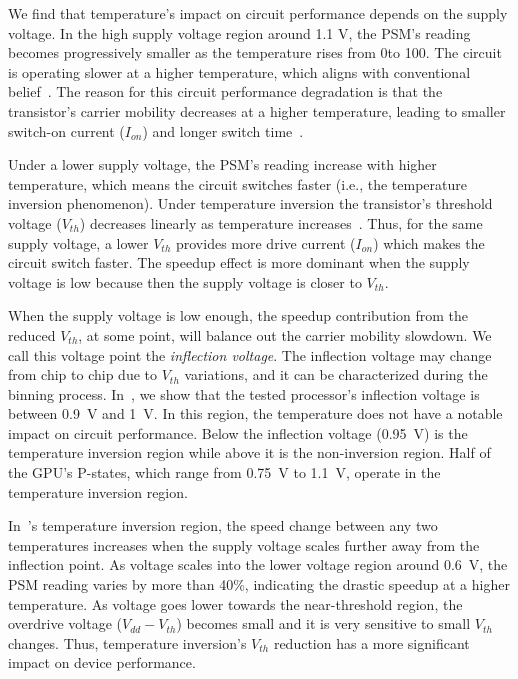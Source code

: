 We find that temperature's impact on circuit performance depends on the supply voltage. In the high supply voltage region around 1.1 V, the PSM's reading becomes progressively smaller as the temperature rises from 0\C to 100\C. The circuit is operating slower at a higher temperature, which aligns with conventional belief~\cite{leng2015safe}. The reason for this circuit performance degradation is that the transistor's carrier mobility decreases at a higher temperature, leading to smaller switch-on current ($I_{on}$) and longer switch time~\cite{wolpert2012temperature}.

Under a lower supply voltage, the PSM's reading increase with higher temperature, which means the circuit switches faster (i.e., the temperature inversion phenomenon). Under temperature inversion the transistor's threshold voltage ($V_{th}$) decreases linearly as temperature increases~\cite{wolpert2012temperature,park1995reversal,dasdan2006handling}. Thus, for the same supply voltage, a lower $V_{th}$ provides more drive current ($I_{on}$) which makes the circuit switch faster. The speedup effect is more dominant when the supply voltage is low because then the supply voltage is closer to $V_{th}$.

When the supply voltage is low enough, the speedup contribution from the reduced $V_{th}$, at some point, will balance out the carrier mobility slowdown. We call this voltage point the {\it inflection voltage}. The inflection voltage may change from chip to chip due to $V_{th}$ variations, and it can be characterized during the binning process. In~, we show that the tested processor's inflection voltage is between 0.9~V and 1~V. In this region, the temperature does not have a notable impact on circuit performance. Below the inflection voltage (0.95~V) is the temperature inversion region while above it is the non-inversion region. Half of the GPU's P-states, which range from 0.75~V to 1.1~V, operate in the temperature inversion region.

In~'s temperature inversion region, the speed change between any two temperatures increases when the supply voltage scales further away from the inflection point. As voltage scales into the lower voltage region around 0.6~V, the PSM reading varies by more than 40\%, indicating the drastic speedup at a higher temperature. As voltage goes lower towards the near-threshold region, the overdrive voltage ($V_{dd}-V_{th}$) becomes small and it is very sensitive to small $V_{th}$ changes. Thus, temperature inversion's $V_{th}$ reduction has a more significant impact on device performance.

